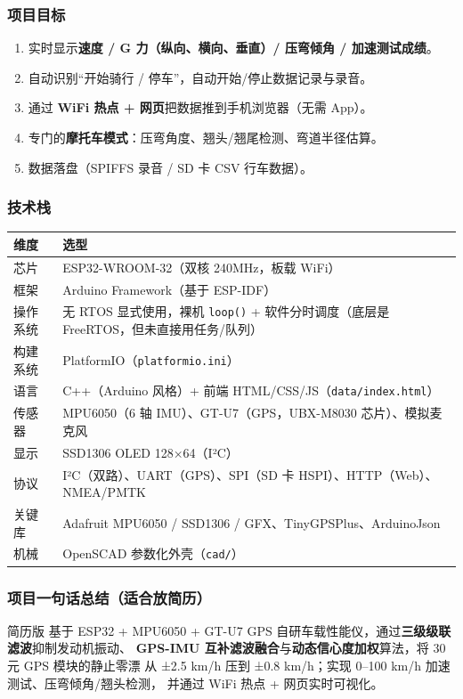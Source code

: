 \documentclass[UTF8,11pt,a4paper]{ctexart}
\begin{document}
\subsubsection{项目目标}
\begin{enumerate}
  \item 实时显示\textbf{速度 / G 力（纵向、横向、垂直）/ 压弯倾角 / 加速测试成绩}。
  \item 自动识别“开始骑行 / 停车”，自动开始/停止数据记录与录音。
  \item 通过 \textbf{WiFi 热点 + 网页}把数据推到手机浏览器（无需 App）。
  \item 专门的\textbf{摩托车模式}：压弯角度、翘头/翘尾检测、弯道半径估算。
  \item 数据落盘（SPIFFS 录音 / SD 卡 CSV 行车数据）。
\end{enumerate}

\subsubsection{技术栈}
\begin{center}\small
\begin{tabularx}{\linewidth}{@{}lX@{}}
\toprule
\textbf{维度} & \textbf{选型} \\
\midrule
芯片 & ESP32-WROOM-32（双核 240MHz，板载 WiFi） \\
框架 & Arduino Framework（基于 ESP-IDF） \\
操作系统 & 无 RTOS 显式使用，裸机 \texttt{loop()} + 软件分时调度（底层是 FreeRTOS，但未直接用任务/队列） \\
构建系统 & PlatformIO（\texttt{platformio.ini}） \\
语言 & C++（Arduino 风格）+ 前端 HTML/CSS/JS（\texttt{data/index.html}） \\
传感器 & MPU6050（6 轴 IMU）、GT-U7（GPS，UBX-M8030 芯片）、模拟麦克风 \\
显示 & SSD1306 OLED 128×64（I²C） \\
协议 & I²C（双路）、UART（GPS）、SPI（SD 卡 HSPI）、HTTP（Web）、NMEA/PMTK \\
关键库 & Adafruit MPU6050 / SSD1306 / GFX、TinyGPSPlus、ArduinoJson \\
机械 & OpenSCAD 参数化外壳（\texttt{cad/}） \\
\bottomrule
\end{tabularx}
\end{center}

\subsubsection{项目一句话总结（适合放简历）}
\begin{say}{简历版}
基于 ESP32 + MPU6050 + GT-U7 GPS 自研车载性能仪，通过\textbf{三级级联滤波}抑制发动机振动、
\textbf{GPS-IMU 互补滤波融合}与\textbf{动态信心度加权}算法，将 30 元 GPS 模块的静止零漂
从 ±2.5 km/h 压到 ±0.8 km/h；实现 0--100 km/h 加速测试、压弯倾角/翘头检测，
并通过 WiFi 热点 + 网页实时可视化。
\end{say}
\end{document}
